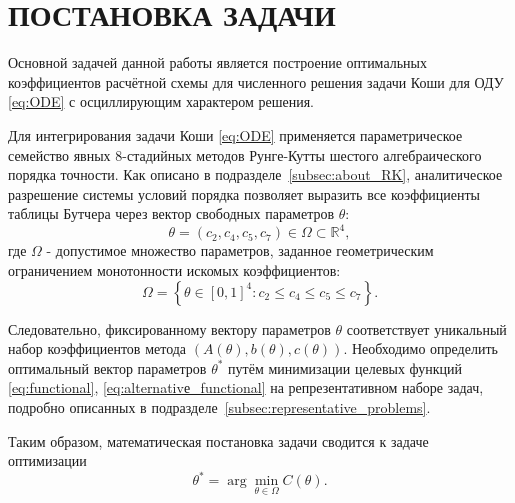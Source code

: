 \newpage
\pagestyle{plain}

\section{\centering ПОСТАНОВКА ЗАДАЧИ}
Основной задачей данной работы является построение оптимальных коэффициентов расчётной схемы для численного решения задачи Коши для ОДУ \eqref{eq:ODE} с осциллирующим характером решения.

Для интегрирования задачи Коши \eqref{eq:ODE} применяется параметрическое семейство явных 8-стадийных методов Рунге-Кутты шестого алгебраического порядка точности. Как описано в подразделе~\ref{subsec:about_RK}, аналитическое разрешение системы условий порядка позволяет выразить все коэффициенты таблицы Бутчера через вектор свободных параметров $\theta$:
\begin{equation*}
	\theta = (c_2, c_4, c_5, c_7) \in \Omega \subset \mathbb{R}^4,
\end{equation*}
где $\Omega$ - допустимое множество параметров, заданное геометрическим ограничением монотонности искомых коэффициентов:
\begin{equation*}
	\Omega = \left\{ \theta \in [0, 1]^4: c_2 \leqslant c_4 \leqslant c_5 \leqslant c_7 \right\}.
\end{equation*}

Следовательно, фиксированному вектору параметров $\theta$ соответствует уникальный набор коэффициентов метода $(A(\theta), b(\theta), c(\theta))$. Необходимо определить оптимальный вектор параметров $\theta^*$ путём минимизации целевых функций \eqref{eq:functional}, \eqref{eq:alternativе_functional} на репрезентативном наборе задач, подробно описанных в подразделе~\ref{subsec:representative_problems}. 

Таким образом, математическая постановка задачи сводится к задаче оптимизации
\begin{equation*}
	\theta^* = \arg\min_{\theta \in \Omega} C(\theta).
\end{equation*}